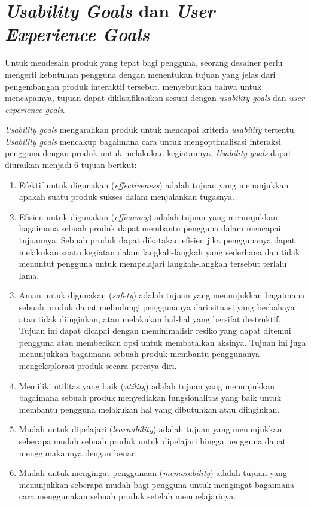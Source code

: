 \section{\textit{Usability Goals} dan \textit{User Experience Goals}}
Untuk mendesain produk yang tepat bagi pengguna, seorang desainer perlu mengerti kebutuhan pengguna dengan menentukan tujuan yang jelas dari pengembangan produk interaktif tersebut. \textcite{sharp2019interaction} menyebutkan bahwa untuk mencapainya, tujuan dapat diklasifikasikan sesuai dengan \textit{usability goals} dan \textit{user experience goals}.



\textit{Usability goals} mengarahkan produk untuk mencapai kriteria \textit{usability} tertentu. \textit{Usability goals} mencakup bagaimana cara untuk mengoptimalisasi interaksi pengguna dengan produk untuk melakukan kegiatannya. \textit{Usability goals} dapat diuraikan menjadi 6 tujuan berikut:
\begin{enumerate}
  \item Efektif untuk digunakan (\textit{effectiveness}) adalah tujuan yang menunjukkan apakah suatu produk sukses dalam menjalankan tugasnya.
  \item Efisien untuk digunakan (\textit{efficiency}) adalah tujuan yang menunjukkan bagaimana sebuah produk dapat membantu pengguna dalam mencapai tujuannya. Sebuah produk dapat dikatakan efisien jika penggunanya dapat melakukan suatu kegiatan dalam langkah-langkah yang sederhana dan tidak menuntut pengguna untuk mempelajari langkah-langkah tersebut terlalu lama.
  \item Aman untuk digunakan (\textit{safety}) adalah tujuan yang menunjukkan bagaimana sebuah produk dapat melindungi penggunanya dari situasi yang berbahaya atau tidak diinginkan, atau melakukan hal-hal yang bersifat destruktif. Tujuan ini dapat dicapai dengan meminimalisir resiko yang dapat ditemui pengguna atau memberikan opsi untuk membatalkan aksinya. Tujuan ini juga menunjukkan bagaimana sebuah produk membantu penggunanya mengeksplorasi produk secara percaya diri.
  \item Memiliki utilitas yang baik (\textit{utility}) adalah tujuan yang menunjukkan bagaimana sebuah produk menyediakan fungsionalitas yang baik untuk membantu pengguna melakukan hal yang dibutuhkan atau diinginkan.
  \item Mudah untuk dipelajari (\textit{learnability}) adalah tujuan yang menunjukkan seberapa mudah sebuah produk untuk dipelajari hingga pengguna dapat menggunakannya dengan benar.
  \item Mudah untuk mengingat penggunaan (\textit{memorability}) adalah tujuan yang menunjukkan seberapa mudah bagi pengguna untuk mengingat bagaimana cara menggunakan sebuah produk setelah mempelajarinya.
\end{enumerate}


